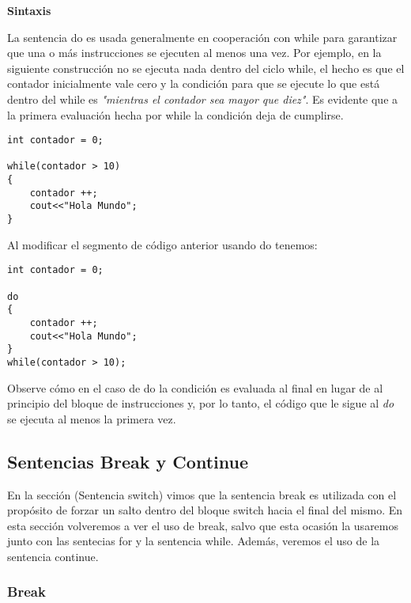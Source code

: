 \begin{center}
	\textbf{Sintaxis}
\end{center}

La sentencia do es usada generalmente en cooperación con while para garantizar que una o más instrucciones se ejecuten al menos una vez. Por ejemplo, en la siguiente construcción no se ejecuta nada dentro del ciclo while, el hecho es que el contador inicialmente vale cero y la condición para que se ejecute lo que está dentro del while es \textit{"mientras el contador sea mayor que diez"}. Es evidente que a la primera evaluación hecha por while la condición deja de cumplirse.

\begin{lstlisting}[style=Cpp, label=sintaxis-do-while, caption=Sintaxis Do While]
int contador = 0;
 
while(contador > 10)
{
    contador ++;
    cout<<"Hola Mundo";
}
\end{lstlisting}

Al modificar el segmento de código anterior usando do tenemos:

\begin{lstlisting}[style=Cpp, label=sintaxis-do-while, caption=Sintaxis Do While]
int contador = 0;
 
do
{
    contador ++;
    cout<<"Hola Mundo";
}
while(contador > 10);
\end{lstlisting}

Observe cómo en el caso de do la condición es evaluada al final en lugar de al principio del bloque de instrucciones y, por lo tanto, el código que le sigue al \textit{do} se ejecuta al menos la primera vez.


\subsection{Sentencias Break y Continue}

En la sección (Sentencia switch) vimos que la sentencia break es utilizada con el propósito de forzar un salto dentro del bloque switch hacia el final del mismo. En esta sección volveremos a ver el uso de break, salvo que esta ocasión la usaremos junto con las sentecias for y la sentencia while. Además, veremos el uso de la sentencia continue.


\subsubsection{Break}

